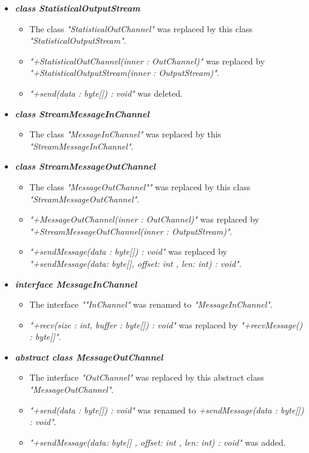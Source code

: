 \documentclass[a4paper,10pt]{scrartcl}
\begin{document}
\begin{itemize}
   \item \textbf{\textit{class StatisticalOutputStream}}
	\begin{itemize}
	 \item The class \textit{"StatisticalOutChannel"} was replaced by this class \textit{"StatisticalOutputStream"}.
	 \item \textit{"+StatisticalOutChannel(inner : OutChannel)"} was replaced by 
	 \textit{"+StatisticalOutputStream(inner : OutputStream)"}.
   \item \textit{"+send(data : byte[]) : void"} was deleted.
	\end{itemize}
 
   \item \textbf{\textit{class StreamMessageInChannel}}
	\begin{itemize}
	 \item The class \textit{"MessageInChannel"} was replaced by this \textit{"StreamMessageInChannel"}.
	\end{itemize}
	
   \item \textbf{\textit{class StreamMessageOutChannel}}
	\begin{itemize}
	 \item The class \textit{"MessageOutChannel""} was replaced by this class \textit{"StreamMessageOutChannel"}.
	 \item \textit{"+MessageOutChannel(inner : OutChannel)"} was replaced by 
	 \textit{"+StreamMessageOutChannel(inner : OutputStream)"}.
	 \item \textit{"+sendMessage(data : byte[]) : void"} was replaced by 
	 \textit{"+sendMessage(data: byte[], offset: int , len: int) : void"}.
	\end{itemize}
	
   \item \textbf{\textit{interface MessageInChannel}}
	\begin{itemize}
	 \item The interface \textit{""InChannel"} was renamed to \textit{"MessageInChannel"}.
	 \item \textit{"+recv(size : int, buffer : byte[]) : void"} was replaced by \textit{"+recvMessage() : byte[]"}.
	\end{itemize}
	
	 \item \textbf{\textit{abstract class MessageOutChannel}}
	\begin{itemize}
	 \item The interface \textit{"OutChannel"} was replaced by this abstract class \textit{"MessageOutChannel"}.
	 \item \textit{"+send(data : byte[]) : void"} was renamed to \textit{+sendMessage(data : byte[]) : void"}.
	 \item \textit{"+sendMessage(data: byte[] , offset: int , len: int) : void"} was added.
	\end{itemize}
	
\end{itemize}
\end{document}
